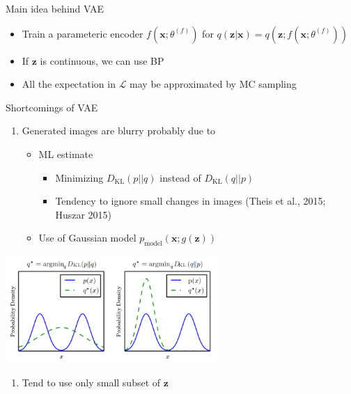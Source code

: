 \documentclass[dvipdfmx,presentation]{beamer}
\def\bf{\mathbf}
\begin{document}
\begin{frame}[label={sec:orgheadline23}]{Main idea behind VAE}
\begin{itemize}
\item Train a parameteric encoder \(f(\bf{x}; \theta^{(f)})\) for \(q(\bf{z} | \bf{x}) = q(\bf{z}; f(\bf{x}; \theta^{(f)}))\)
\item If \(\bf{z}\) is continuous, we can use BP
\item All the expectation in \(\mathcal{L}\) may be approximated by MC sampling
\end{itemize}
\end{frame}

\begin{frame}[label={sec:orgheadline24}]{Shortcomings of VAE}
\begin{enumerate}
\item Generated images are blurry probably due to
\begin{itemize}
\item ML estimate
\begin{itemize}
\item Minimizing \(D_{\mathrm{KL}}(p || q)\) instead of \(D_{\mathrm{KL}}(q || p)\)
\item Tendency to ignore small changes in images (Theis et al., 2015; Huszar 2015)
\end{itemize}
\item Use of Gaussian model \(p_{\mathrm{model}}(\bf{x}; g(\bf{z}))\)
\end{itemize}
\end{enumerate}
\centering
\includegraphics[width=0.60\textwidth]{./figure/dlbook_fig3_6.png}
\begin{enumerate}
\item Tend to use only small subset of \(\bf{z}\)
\end{enumerate}
\end{frame}
\end{document}
